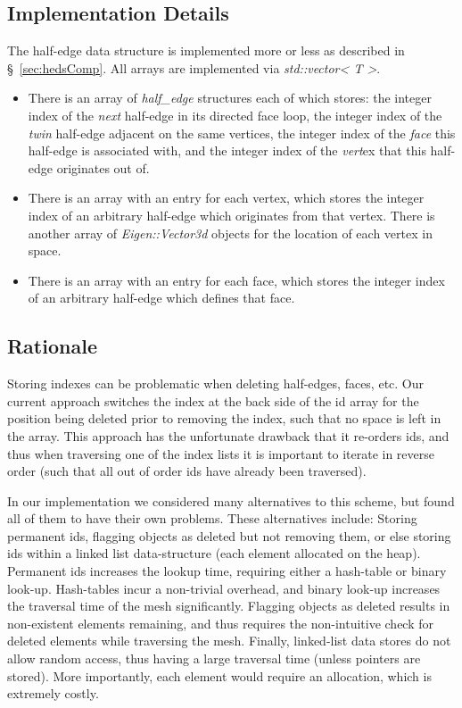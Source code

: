 \documentclass{article}
\begin{document}
\subsection{Implementation Details}
The half-edge data structure is implemented more or less as described in \S~\ref{sec:hedsComp}. All arrays are implemented via {\it std::vector< T >}. 
\begin{itemize}
\item There is an array of {\it half\_edge} structures each of which stores: the integer index of the {\it next} half-edge in its directed face loop, the integer index of the {\it twin} half-edge adjacent on the same vertices, the integer index of the {\it face} this half-edge is associated with, and the integer index of the {\it vert}ex that this half-edge originates out of.
\item There is an array with an entry for each vertex, which stores the integer index of an arbitrary half-edge which originates from that vertex. There is another array of {\it Eigen::Vector3d} objects for the location of each vertex in space.
\item There is an array with an entry for each face, which stores the integer index of an arbitrary half-edge which defines that face.
\end{itemize}

\subsection{Rationale}

Storing indexes can be problematic when deleting half-edges, faces, etc. Our current approach switches the index at the back side of the id array for the position being deleted prior to removing the index, such that no space is left in the array. This approach has the unfortunate drawback that it re-orders ids, and thus when traversing one of the index lists it is important to iterate in reverse order (such that all out of order ids have already been traversed).

In our implementation we considered many alternatives to this scheme, but found all of them to have their own problems. These alternatives include: Storing permanent ids, flagging objects as deleted but not removing them, or else storing ids within a linked list data-structure (each element allocated on the heap). Permanent ids increases the lookup time, requiring either a hash-table or binary look-up. Hash-tables incur a non-trivial overhead, and binary look-up increases the traversal time of the mesh significantly. Flagging objects as deleted results in non-existent elements remaining, and thus requires the non-intuitive check for deleted elements while traversing the mesh. Finally, linked-list data stores do not allow random access, thus having a large traversal time (unless pointers are stored). More importantly, each element would require an allocation, which is extremely costly.
\end{document}

